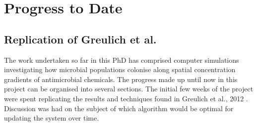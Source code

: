 \documentclass[a4paper,12pt]{article}
\begin{document}



% 
% 
% 

\section{Progress to Date}




\subsection{Replication of Greulich et al.}

The work undertaken so far in this PhD has comprised computer simulations investigating how microbial populations colonise along spatial concentration gradients of antimicrobial 
chemicals.  The progress made up until now in this project can be organised into several sections.  The initial few weeks of the project 
were spent replicating the results and techniques found in Greulich et al., 2012 \cite{bioref:PRL-drugGradients}.  Discussion was had
on the subject of which algorithm would be optimal for updating the system over time.  
\end{document}
